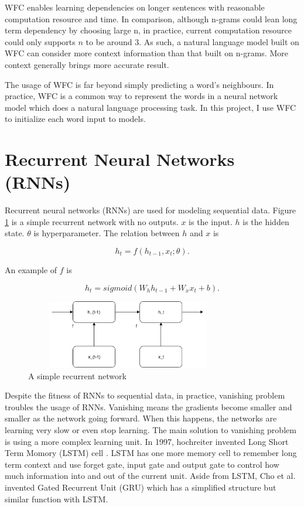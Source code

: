 \documentclass[modernstyle,12pt]{sjsuthesis}
\theoremstyle{definition}
\begin{document}
WFC enables learning dependencies on longer sentences with reasonable computation resource and time. In comparison, although n-grams could lean long term dependency by choosing large n, in practice, current computation resource could only supports $n$ to be around 3. As such, a natural language model built on WFC can consider more context information than that built on n-grams. More context generally brings more accurate result.

The usage of WFC is far beyond simply predicting a word's neighbours. In practice, WFC is a common way to represent the words in a neural network model which does a natural language processing task. In this project, I use WFC to initialize each word input to models.

\section{Recurrent Neural Networks (RNNs)}\label{sect:rnn}

Recurrent neural networks (RNNs) \cite{rumelhart1986learning} are used for modeling sequential data. Figure \ref{f:rnnWithNoOutputs} is a simple recurrent network with no outputs. $x$ is the input. $h$ is the hidden state. $\theta$ is hyperparameter. The relation between $h$ and $x$ is

$$h_t = f(h_{t-1}, x_t; \theta).$$

An example of $f$ is

$$h_t = sigmoid(W_h h_{t-1} + W_x x_t + b).$$

\begin{figure}[htbp]\centering
  \includegraphics[width=9cm, height=3cm]{figures/rnnWithNoOutputs}
  \caption{A simple recurrent network}
  \label{f:rnnWithNoOutputs}
\end{figure}



Despite the fitness of RNNs to sequential data, in practice, vanishing problem troubles the usage of RNNs. Vanishing means the gradients become smaller and smaller as the network going forward. When this happens, the networks are learning very slow or even stop learning. The main solution to vanishing problem is using a more complex learning unit. In 1997, hochreiter invented Long Short Term Momory (LSTM) cell \cite{hochreiter1997long}. LSTM has one more memory cell to remember long term context and use forget gate, input gate and output gate to control how much information into and out of the current unit. Aside from LSTM, Cho et al. invented Gated Recurrent Unit (GRU)\cite{cho2014learning} which has a simplified structure but similar function with LSTM.
\end{document}
